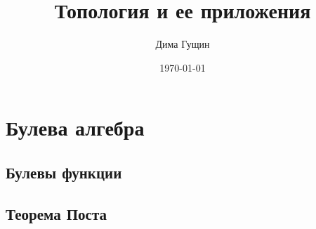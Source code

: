 \documentclass[12pt, oneside]{book}
\author{Дима Гущин}
\title{Топология и ее приложения}
\date{\today}
\begin{document}
	
	
		
	
		
	
	\chapter{Булева алгебра} 
		\section{Булевы функции}
%		
%		
		
%		
		\section{Теорема Поста}
		
		
		
		
	\titlespacing*{\chapter}{0pt}{0pt}{40pt}
	
\end{document}
